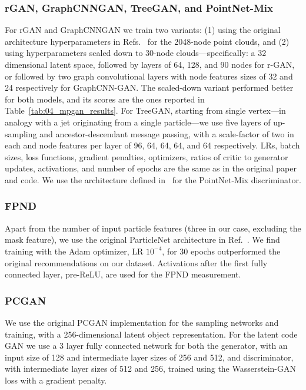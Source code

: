\subsubsection{rGAN, GraphCNNGAN, TreeGAN, and PointNet-Mix}

For rGAN and GraphCNNGAN we train two variants: (1) using the original architecture hyperparameters in Refs.~\cite{rgan, graphcnngan} for the 2048-node point clouds, and (2) using hyperparameters scaled down to 30-node clouds---specifically: a 32 dimensional latent space, followed by layers of 64, 128, and 90 nodes for r-GAN, or followed by two graph convolutional layers with node features sizes of 32 and 24 respectively for GraphCNN-GAN.
The scaled-down variant performed better for both models, and its scores are the ones reported in Table~\ref{tab:04_mpgan_results}.
For TreeGAN, starting from single vertex---in analogy with a jet originating from a single particle---we use five layers of up-sampling and ancestor-descendant message passing, with a scale-factor of two in each and node features per layer of 96, 64, 64, 64, and 64 respectively.
LRs, batch sizes, loss functions, gradient penalties, optimizers, ratios of critic to generator updates, activations, and number of epochs are the same as in the original paper and code.
We use the architecture defined in~\cite{wang2020rethinking} for the PointNet-Mix discriminator.

\subsubsection{FPND}
\label{app:04_mpgan_pnet}

Apart from the number of input particle features (three in our case, excluding the mask feature), we use the original ParticleNet architecture in Ref.~\cite{Qu:2019gqs}.
We find training with the Adam optimizer, LR $10^{-4}$, for 30 epochs outperformed the original recommendations on our dataset.
Activations after the first fully connected layer, pre-ReLU, are used for the FPND measurement.

\subsubsection{PCGAN}
\label{app:04_mpgan_pcgan}

We use the original PCGAN implementation for the sampling networks and training, with a 256-dimensional latent object representation.
For the latent code GAN we use a 3 layer fully connected network for both the generator, with an input size of 128 and intermediate layer sizes of 256 and 512, and discriminator, with intermediate layer sizes of 512 and 256, trained using the Wasserstein-GAN~\cite{WGAN} loss with a gradient penalty.


